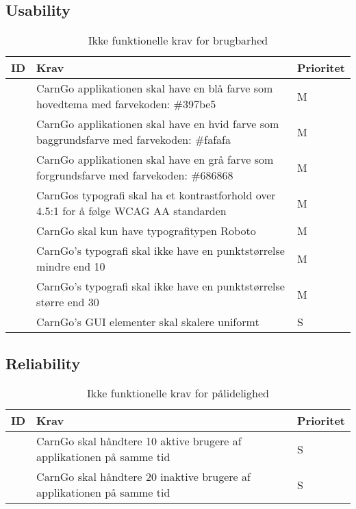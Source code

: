 \documentclass[Kravspecifikation/Kravspec_Main.tex]{subfiles}
\begin{document}
\subsection{Usability}
\begin{table}[H]
\centering
\begin{tabular}{|L{0.1\textwidth}|L{0.6\textwidth}|L{0.15\textwidth}|}
\hline
\textbf{ID} & \textbf{Krav} & \textbf{Prioritet} \\ \hline
\subreq{} & CarnGo applikationen skal have en blå farve som hovedtema med farvekoden: \#397be5 & M \\ \hline
\subreq{} & CarnGo applikationen skal have en hvid farve som baggrundsfarve med farvekoden: \#fafafa & M \\ \hline
\subreq{} & CarnGo applikationen skal have en grå farve som forgrundsfarve med farvekoden: \#686868 & M \\ \hline
\subreq{} & CarnGos typografi skal ha et kontrastforhold over 4.5:1 for å følge WCAG AA standarden & M \\ \hline
\subreq{} & CarnGo skal kun have typografitypen Roboto & M \\ \hline
\subreq{} & CarnGo's typografi skal ikke have en punktstørrelse mindre end 10 & M \\ \hline
\subreq{} & CarnGo's typografi skal ikke have en punktstørrelse større end 30 & M \\ \hline
\subreq{} & CarnGo's GUI elementer skal skalere uniformt & S \\ \hline
\end{tabular}
\caption{Ikke funktionelle krav for brugbarhed}
\label{tab:brugbarhed}
\end{table}


\subsection{Reliability}
\begin{table}[H]
\centering
\begin{tabular}{|L{0.1\textwidth}|L{0.6\textwidth}|L{0.15\textwidth}|}
\hline
\textbf{ID} & \textbf{Krav} & \textbf{Prioritet} \\ \hline
\subreq{} & CarnGo skal håndtere 10 aktive brugere af applikationen på samme tid & S \\ \hline
\subreq{} & CarnGo skal håndtere 20 inaktive brugere af applikationen på samme tid & S \\ \hline
\end{tabular}
\caption{Ikke funktionelle krav for pålidelighed}
\label{tab:pålidelighed}
\end{table}
\end{document}
